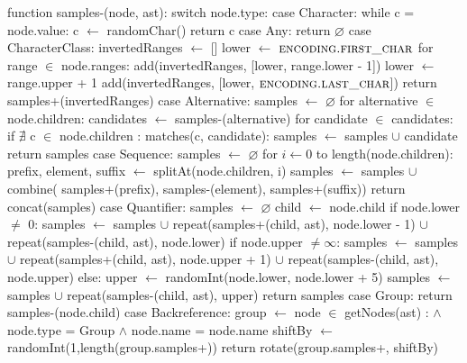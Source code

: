 \begin{pseudoCode}[title={Generating Negative Test Samples},breakable=true,label=code:verificationNegative]
function samples-(node, ast):
  switch node.type:
    case Character: %
      while c = node.value:
        c $\gets$ randomChar()
      return c
    case Any:
      return $\varnothing$ %
    case CharacterClass: %
      invertedRanges $\gets$ []
      lower $\gets$ $\textsc{encoding.first\_char}$ 
      for range $\in$ node.ranges:
        add(invertedRanges, [lower, range.lower - 1])
        lower $\gets$ range.upper + 1
      add(invertedRanges, [lower, $\textsc{encoding.last\_char}$])
      return samples+(invertedRanges) %
    case Alternative: %
      samples $\gets$ $\varnothing$
      for alternative $\in$ node.children:
        candidates $\gets$ samples-(alternative)
        for candidate $\in$ candidates:
          if $\nexists$ c $\in$ node.children : matches(c, candidate):
            samples $\gets$ samples $\cup$ candidate
      return samples %
    case Sequence:
      samples $\gets$ $\varnothing$ 
      for $i \gets 0$ to length(node.children):
        prefix, element, suffix $\gets$ splitAt(node.children, i)
        samples $\gets$ samples $\cup$ combine(
                              samples+(prefix), 
                              samples-(element), 
                              samples+(suffix))
      return concat(samples)
    case Quantifier: %
      samples $\gets$ $\varnothing$ 
      child $\gets$ node.child
      if node.lower $\neq$ 0:
        samples $\gets$ samples 
                $\cup$ repeat(samples+(child, ast), node.lower - 1) 
                $\cup$ repeat(samples-(child, ast), node.lower)
      if node.upper $\neq \infty$:
        samples $\gets$ samples 
                $\cup$ repeat(samples+(child, ast), node.upper + 1)
                $\cup$ repeat(samples-(child, ast), node.upper)
      else:
        upper $\gets$ randomInt(node.lower, node.lower + 5)
        samples $\gets$ samples 
                    $\cup$ repeat(samples-(child, ast), upper) %
      return samples
    case Group:
      return samples-(node.child)
    case Backreference:  %
      group $\gets$ node $\in$ getNodes(ast) :
                        $\land$ node.type = Group 
                        $\land$ node.name = node.name
      shiftBy $\gets$ randomInt(1,length(group.samples+))
      return rotate(group.samples+, shiftBy) %
\end{pseudoCode}



